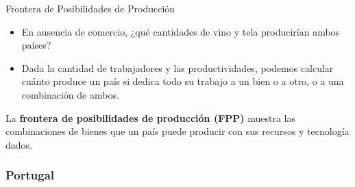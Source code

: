 \documentclass{beamer}
\begin{document}
\begin{frame}{Frontera de Posibilidades de Producción}
    \begin{itemize}
        \item En ausencia de comercio, ¿qué cantidades de vino y tela producirían ambos países? 
        \vspace{2mm}
        \item Dada la cantidad de trabajadores y las productividades, podemos calcular cuánto produce un país si dedica todo su trabajo a un bien o a otro, o a una combinación de ambos.
    \end{itemize}
    \vspace{4mm}
    \begin{boxB}
        \centering
        La \textbf{frontera de posibilidades de producción (FPP)} muestra las combinaciones de bienes que un país puede producir con sus recursos y tecnología dados.
    \end{boxB}
\end{frame}

\begin{frame}
\frametitle{Portugal}

\begin{figure}[h]
    \centering
\end{figure}

\end{frame}
\end{document}
